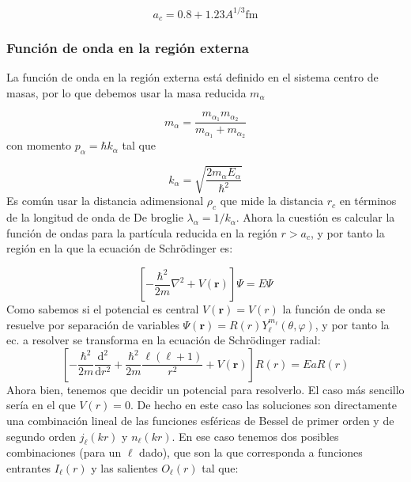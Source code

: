 \documentclass[fleqn,10pt]{SelfArx} %
\newcommand{\D}{\mathrm{d}}
\newcommand{\derivadas}[2]{\frac{\D #1}{\D #2}}
\newcommand{\rn}{\mathbf{r}}
\begin{document}
\begin{equation}
	a_c = 0.8 + 1.23 A^{1/3} \text{fm}
\end{equation} 

\subsubsection{Función de onda en la región externa}

La función de onda en la región externa está definido en el sistema centro de masas, por lo que debemos usar la masa reducida $m_\alpha$ 

\begin{equation}
	m_\alpha = \frac{m_{\alpha_1}m_{\alpha_2}}{m_{\alpha_1}+m_{\alpha_2}}
\end{equation}
con momento $p_\alpha=\hbar k_\alpha$ tal que 
 
\begin{equation}
	k_\alpha =\sqrt{\frac{2m_\alpha E_\alpha}{\hbar^2}}
\end{equation}
Es común usar la distancia adimensional $\rho_c$ que mide la distancia $r_c$ en términos de la longitud de onda de De broglie $\lambda_\alpha=1/k_\alpha$. Ahora la cuestión es calcular la función de ondas para la partícula reducida en la región $r>a_c$, y por tanto la región en la que la ecuación de Schrödinger es:

\begin{equation}
	\left[ - \frac{\hbar^2}{2m} \nabla^2 + V(\rn) \right] \Psi = E \Psi
\end{equation}
Como sabemos si el potencial es central $V(\rn)=V(r)$ la función de onda se resuelve por separación de variables $\Psi(\rn)=R(r) Y_\ell^{m_\ell} (\theta,\varphi)$, y por tanto la ec. a resolver se transforma en la ecuación de Schrödinger radial:  
\begin{equation}
	\left[- \frac{\hbar^2}{2m} \derivadas{^2}{r^2} + \frac{\hbar^2}{2m} \frac{\ell (\ell+1)}{r^2} +  V(\rn) \right] R(r) = E aR(r)
\end{equation}
Ahora bien, tenemos que decidir un potencial para resolverlo. El caso más sencillo sería en el que $V(r)=0$. De hecho en este caso las soluciones son directamente una combinación lineal de las funciones esféricas de Bessel de primer orden y de segundo orden $j_\ell(kr)$ y $n_\ell (kr)$. En ese caso tenemos dos posibles combinaciones (para un $\ell$ dado), que son la que corresponda a funciones entrantes $I_\ell (r)$ y las salientes $O_\ell (r)$ tal que:
\end{document}
